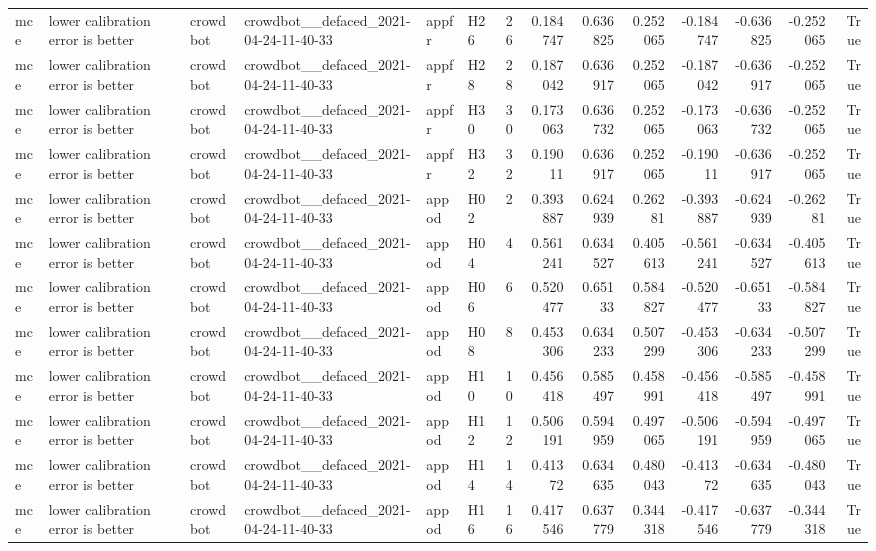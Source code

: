 \begin{longtable}{llllllrrrrrrrr}
mce & lower calibration error is better & crowdbot & crowdbot\_\_defaced\_2021-04-24-11-40-33 & appfr & H26 & 26 & 0.184747 & 0.636825 & 0.252065 & -0.184747 & -0.636825 & -0.252065 & True \\
mce & lower calibration error is better & crowdbot & crowdbot\_\_defaced\_2021-04-24-11-40-33 & appfr & H28 & 28 & 0.187042 & 0.636917 & 0.252065 & -0.187042 & -0.636917 & -0.252065 & True \\
mce & lower calibration error is better & crowdbot & crowdbot\_\_defaced\_2021-04-24-11-40-33 & appfr & H30 & 30 & 0.173063 & 0.636732 & 0.252065 & -0.173063 & -0.636732 & -0.252065 & True \\
mce & lower calibration error is better & crowdbot & crowdbot\_\_defaced\_2021-04-24-11-40-33 & appfr & H32 & 32 & 0.19011 & 0.636917 & 0.252065 & -0.19011 & -0.636917 & -0.252065 & True \\
mce & lower calibration error is better & crowdbot & crowdbot\_\_defaced\_2021-04-24-11-40-33 & appod & H02 & 2 & 0.393887 & 0.624939 & 0.26281 & -0.393887 & -0.624939 & -0.26281 & True \\
mce & lower calibration error is better & crowdbot & crowdbot\_\_defaced\_2021-04-24-11-40-33 & appod & H04 & 4 & 0.561241 & 0.634527 & 0.405613 & -0.561241 & -0.634527 & -0.405613 & True \\
mce & lower calibration error is better & crowdbot & crowdbot\_\_defaced\_2021-04-24-11-40-33 & appod & H06 & 6 & 0.520477 & 0.65133 & 0.584827 & -0.520477 & -0.65133 & -0.584827 & True \\
mce & lower calibration error is better & crowdbot & crowdbot\_\_defaced\_2021-04-24-11-40-33 & appod & H08 & 8 & 0.453306 & 0.634233 & 0.507299 & -0.453306 & -0.634233 & -0.507299 & True \\
mce & lower calibration error is better & crowdbot & crowdbot\_\_defaced\_2021-04-24-11-40-33 & appod & H10 & 10 & 0.456418 & 0.585497 & 0.458991 & -0.456418 & -0.585497 & -0.458991 & True \\
mce & lower calibration error is better & crowdbot & crowdbot\_\_defaced\_2021-04-24-11-40-33 & appod & H12 & 12 & 0.506191 & 0.594959 & 0.497065 & -0.506191 & -0.594959 & -0.497065 & True \\
mce & lower calibration error is better & crowdbot & crowdbot\_\_defaced\_2021-04-24-11-40-33 & appod & H14 & 14 & 0.41372 & 0.634635 & 0.480043 & -0.41372 & -0.634635 & -0.480043 & True \\
mce & lower calibration error is better & crowdbot & crowdbot\_\_defaced\_2021-04-24-11-40-33 & appod & H16 & 16 & 0.417546 & 0.637779 & 0.344318 & -0.417546 & -0.637779 & -0.344318 & True \\

\end{longtable}
